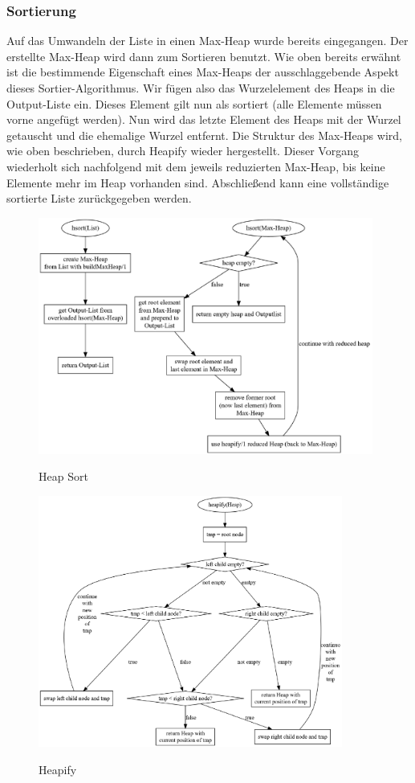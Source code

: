 \documentclass[11pt]{article}
\begin{document}
    \subsubsection{Sortierung}
    Auf das Umwandeln der Liste in einen Max-Heap wurde bereits eingegangen.
    Der erstellte Max-Heap wird dann zum Sortieren benutzt.
    Wie oben bereits erwähnt ist die bestimmende Eigenschaft eines Max-Heaps
    der ausschlaggebende Aspekt dieses Sortier-Algorithmus.
    Wir fügen also das Wurzelelement des Heaps in die Output-Liste ein.
    Dieses Element gilt nun als sortiert (alle Elemente müssen vorne angefügt
    werden).
    Nun wird das letzte Element des Heaps mit der Wurzel getauscht und die
    ehemalige Wurzel entfernt.
    Die Struktur des Max-Heaps wird, wie oben beschrieben, durch Heapify
    wieder hergestellt.
    Dieser Vorgang wiederholt sich nachfolgend mit dem jeweils reduzierten
    Max-Heap, bis keine Elemente mehr im Heap vorhanden sind.
    Abschließend kann eine vollständige sortierte Liste zurückgegeben werden.

    \begin{figure}[hbt]
        \caption{Heap Sort}
        \centering
        \includegraphics[width = 11cm]{hsort.pdf}\label{fig:hsort}
    \end{figure}

    \begin{figure}[hb]
        \caption{Heapify}
        \centering
        \includegraphics[width = 10cm]{heapify.pdf}\label{fig:heapify}
    \end{figure}
\end{document}
